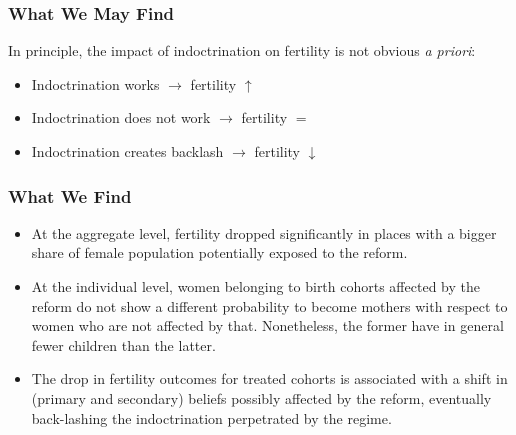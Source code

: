 \documentclass[aspectratio=169]{beamer}
\begin{document}

\begin{frame}
\frametitle{What We May Find}

In principle, the impact of indoctrination on fertility is not obvious \textit{a priori}:
\medskip\pause
\begin{itemize}
    \item Indoctrination works $\rightarrow$ fertility $\uparrow$
    \medskip
    \pause
    \item Indoctrination does not work $\rightarrow$ fertility $=$
    \medskip
    \pause
    \item Indoctrination creates backlash $\rightarrow$ fertility $\downarrow$
    \medskip
    
\end{itemize}
\end{frame} 


\begin{frame}
\frametitle{What We Find}
\begin{itemize}
    \item At the aggregate level, fertility dropped significantly in places with a bigger share of female population potentially exposed to the reform.
\medskip\pause
 \item At the individual level,   women belonging to birth cohorts affected by the reform do not show a different probability to become mothers with respect to women who are not affected by that. Nonetheless, the former have in general fewer children than the latter.
\medskip\pause
    \item The drop in fertility outcomes for treated cohorts is associated with a shift in (primary and secondary) beliefs possibly affected by the reform, eventually back-lashing the indoctrination perpetrated by the regime.

\end{itemize}


\end{frame} 
\end{document}
